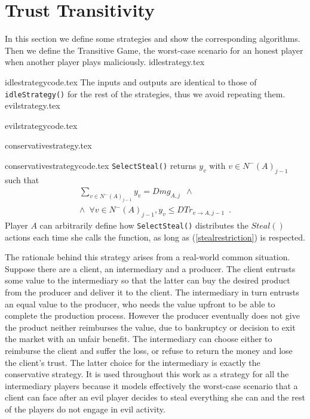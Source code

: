 \section{Trust Transitivity}
  In this section we define some strategies and show the corresponding algorithms. Then we define the Transitive Game, the
  worst-case scenario for an honest player when another player plays maliciously.
  {idlestrategy.tex}

  {idlestrategycode.tex}
  The inputs and outputs are identical to those of \texttt{idleStrategy()} for the rest of the strategies, thus we avoid
  repeating them.
  {evilstrategy.tex}

  {evilstrategycode.tex}

  {conservativestrategy.tex}

  {conservativestrategycode.tex}
  \texttt{SelectSteal()} returns $y_v$ with $v \in N^{-}\left(A\right)_{j-1}$ such that
  \begin{equation}
  \label{stealrestriction}
  \begin{gathered}
     \sum\limits_{v \in N^{-}\left(A\right)_{j-1}}y_v = Dmg_{A, j} \enspace \wedge \\
     \wedge \enspace \forall v \in N^{-}\left(A\right)_{j-1}, y_v \leq DTr_{v \rightarrow A, j-1} \enspace.
  \end{gathered}
  \end{equation}
  Player $A$ can arbitrarily define how \texttt{SelectSteal()} distributes the $Steal\left(\right)$ actions
  each time she calls the function, as long as (\ref{stealrestriction}) is respected.

  The rationale behind this strategy arises from a real-world common situation. Suppose there are a client, an
  intermediary and a producer. The client entrusts some value to the intermediary so that the latter can buy the desired
  product from the producer and deliver it to the client. The intermediary in turn entrusts an equal value to the
  producer, who needs the value upfront to be able to complete the production process. However the producer eventually
  does not give the product neither reimburses the value, due to bankruptcy or decision to exit the market with an unfair
  benefit. The intermediary can choose either to reimburse the client and suffer the loss, or refuse to return the money
  and lose the client's trust. The latter choice for the intermediary is exactly the conservative strategy. It is used
  throughout this work as a strategy for all the intermediary players because it models effectively the worst-case
  scenario that a client can face after an evil player decides to steal everything she can and the rest of the players do
  not engage in evil activity.

